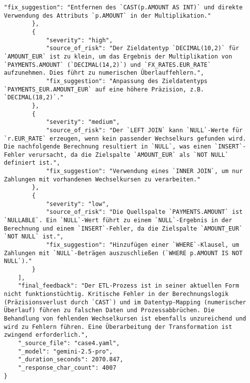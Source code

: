 \begin{lstlisting}[caption={Ausgabe: Gemini 2.5 Pro Anwendungsfall 4 Konsistenzdurchlauf},label={gemini_case4_prompt2}]
            "fix_suggestion": "Entfernen des `CAST(p.AMOUNT AS INT)` und direkte Verwendung des Attributs `p.AMOUNT` in der Multiplikation."
        },
        {
            "severity": "high",
            "source_of_risk": "Der Zieldatentyp `DECIMAL(10,2)` für `AMOUNT_EUR` ist zu klein, um das Ergebnis der Multiplikation von `PAYMENTS.AMOUNT` (`DECIMAL(14,2)`) und `FX_RATES.EUR_RATE` aufzunehmen. Dies führt zu numerischen Überlauffehlern.",
            "fix_suggestion": "Anpassung des Zieldatentyps `PAYMENTS_EUR.AMOUNT_EUR` auf eine höhere Präzision, z.B. `DECIMAL(18,2)`."
        },
        {
            "severity": "medium",
            "source_of_risk": "Der `LEFT JOIN` kann `NULL`-Werte für `r.EUR_RATE` erzeugen, wenn kein passender Wechselkurs gefunden wird. Die nachfolgende Berechnung resultiert in `NULL`, was einen `INSERT`-Fehler verursacht, da die Zielspalte `AMOUNT_EUR` als `NOT NULL` definiert ist.",
            "fix_suggestion": "Verwendung eines `INNER JOIN`, um nur Zahlungen mit vorhandenen Wechselkursen zu verarbeiten."
        },
        {
            "severity": "low",
            "source_of_risk": "Die Quellspalte `PAYMENTS.AMOUNT` ist `NULLABLE`. Ein `NULL`-Wert führt zu einem `NULL`-Ergebnis in der Berechnung und einem `INSERT`-Fehler, da die Zielspalte `AMOUNT_EUR` `NOT NULL` ist.",
            "fix_suggestion": "Hinzufügen einer `WHERE`-Klausel, um Zahlungen mit `NULL`-Beträgen auszuschließen (`WHERE p.AMOUNT IS NOT NULL`)."
        }
    ],
    "final_feedback": "Der ETL-Prozess ist in seiner aktuellen Form nicht funktionstüchtig. Kritische Fehler in der Berechnungslogik (Präzisionsverlust durch `CAST`) und im Datentyp-Mapping (numerischer Überlauf) führen zu falschen Daten und Prozessabbrüchen. Die Behandlung von fehlenden Wechselkursen ist ebenfalls unzureichend und wird zu Fehlern führen. Eine Überarbeitung der Transformation ist zwingend erforderlich.",
    "_source_file": "case4.yaml",
    "_model": "gemini-2.5-pro",
    "_duration_seconds": 2070.847,
    "_response_char_count": 4007
}
\end{lstlisting}

